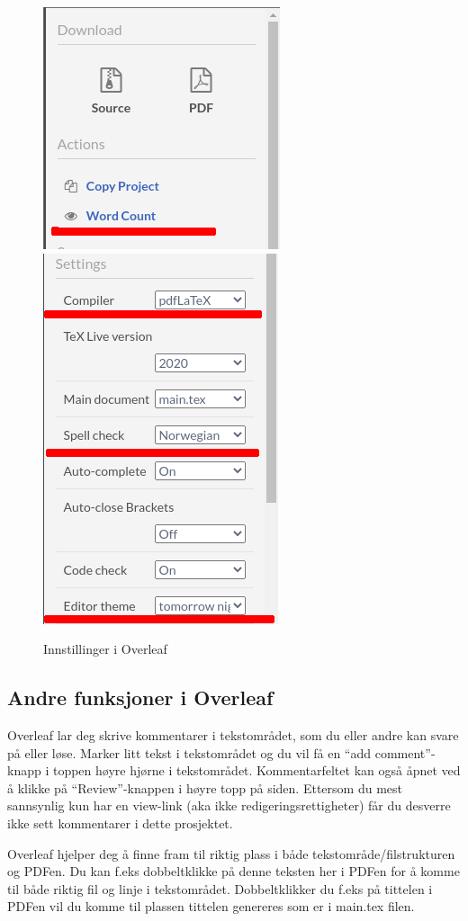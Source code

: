     \begin{figure}[H]
        \centering
        \includegraphics[width=.4\textwidth]{bilder/overleaf-2.png}
        \includegraphics[width=.4\textwidth]{bilder/overleaf-3.png}
        \caption{Innstillinger i Overleaf}
        \label{fig:innstillinger-overleaf}
    \end{figure}
    
    \subsection{Andre funksjoner i Overleaf}
        Overleaf lar deg skrive kommentarer i tekstområdet, som du eller andre kan svare på eller løse. Marker litt tekst i tekstområdet og du vil få en ``add comment''-knapp i toppen høyre hjørne i tekstområdet. Kommentarfeltet kan også åpnet ved å klikke på ``Review''-knappen i høyre topp på siden. Ettersom du mest sannsynlig kun har en view-link (aka ikke redigeringsrettigheter) får du desverre ikke sett kommentarer i dette prosjektet.

        Overleaf hjelper deg å finne fram til riktig plass i både tekstområde/filstrukturen og PDFen.
        Du kan f.eks dobbeltklikke på denne teksten her i PDFen for å komme til både riktig fil og linje i tekstområdet. Dobbeltklikker du f.eks på tittelen i PDFen vil du komme til plassen tittelen genereres som er i main.tex filen. 
        
